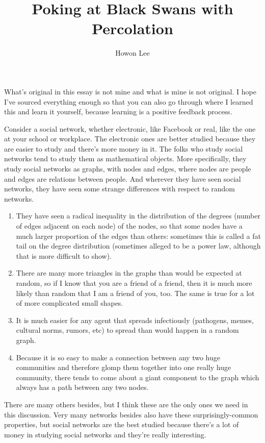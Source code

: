 \documentclass[12pt]{article}
\begin{document}
\title{Poking at Black Swans with Percolation}
\author{Howon Lee}
\maketitle

What's original in this essay is not mine and what is mine is not original. I hope I've sourced everything enough so that you can also go through where I learned this and learn it yourself, because learning is a positive feedback process.

Consider a social network, whether electronic, like Facebook or real, like the one at your school or workplace. The electronic ones are better studied because they are easier to study and there's more money in it. The folks who study social networks tend to study them as mathematical objects. More specifically, they study social networks as graphs, with nodes and edges, where nodes are people and edges are relations between people. And wherever they have seen social networks, they have seen some strange differences with respect to random networks.

\begin{enumerate}
  \item They have seen a radical inequality in the distribution of the degrees (number of edges adjacent on each node) of the nodes, so that some nodes have a much larger proportion of the edges than others: sometimes this is called a fat tail on the degree distribution (sometimes alleged to be a power law, although that is more difficult to show).
  \item There are many more triangles in the graphs than would be expected at random, so if I know that you are a friend of a friend, then it is much more likely than random that I am a friend of you, too. The same is true for a lot of more complicated small shapes.
  \item It is much easier for any agent that spreads infectiously (pathogens, memes, cultural norms, rumors, etc) to spread than would happen in a random graph.
  \item Because it is so easy to make a connection between any two huge communities and therefore glomp them together into one really huge community, there tends to come about a giant component to the graph which always has a path between any two nodes.
\end{enumerate}

There are many others besides, but I think these are the only ones we need in this discussion. Very many networks besides also have these surprisingly-common properties, but social networks are the best studied because there's a lot of money in studying social networks and they're really interesting.
\end{document}
